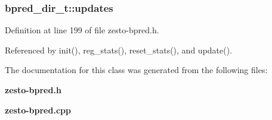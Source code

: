 \subsubsection[{updates}]{ {\bf bpred\_\-dir\_\-t::updates}\hspace{0.3cm}{\tt  [protected]}}\label{classbpred__dir__t_4d16ce2c6b4483b91ded994c32c5be0b}




Definition at line 199 of file zesto-bpred.h.

Referenced by init(), reg\_\-stats(), reset\_\-stats(), and update().

The documentation for this class was generated from the following files:\begin{CompactItemize}
\item 
{\bf zesto-bpred.h}\item 
{\bf zesto-bpred.cpp}\end{CompactItemize}
